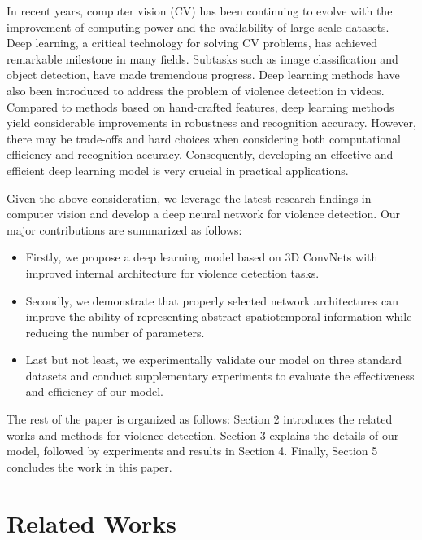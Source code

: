 \documentclass[10pt,twocolumn,letterpaper]{article}
\begin{document}
In recent years, computer vision (CV) has been continuing to evolve with the improvement of computing power and the availability of large-scale datasets.
Deep learning, a critical technology for solving CV problems, has achieved remarkable milestone in many fields.
Subtasks such as image classification and object detection, have made tremendous progress.
Deep learning methods have also been introduced to address the problem of violence detection in videos.
Compared to methods based on hand-crafted features, deep learning methods yield considerable improvements in robustness and recognition accuracy.
However, there may be trade-offs and hard choices when considering both computational efficiency and recognition accuracy.
Consequently, developing an effective and efficient deep learning model is very crucial in practical applications.

Given the above consideration, we leverage the latest research findings in computer vision and develop a deep neural network for violence detection. Our major contributions are summarized as follows:
\begin{itemize}
	\item Firstly, we propose a deep learning model based on 3D ConvNets with improved internal architecture for violence detection tasks.
	\item Secondly, we demonstrate that properly selected network architectures can improve the ability of  representing abstract spatiotemporal information while reducing the number of parameters.
	\item Last but not least, we experimentally validate our model on three standard datasets and conduct supplementary experiments to evaluate the effectiveness and efficiency of our model.
	
\end{itemize}

The rest of the paper is organized as follows: Section 2 introduces the related works and methods for violence detection. Section 3 explains the details of our model, followed by experiments and results in Section 4. Finally, Section 5 concludes the work in this paper.


\section{Related Works}
\end{document}
